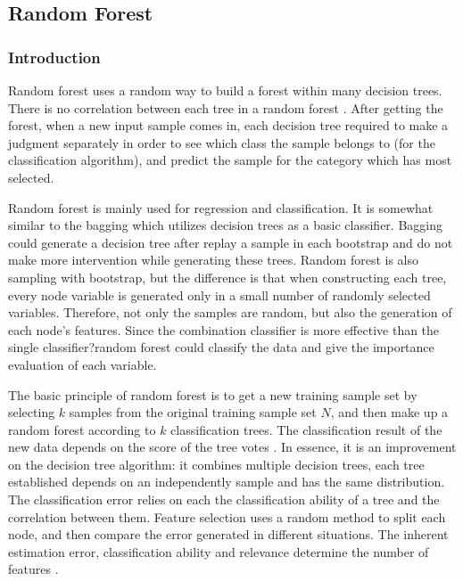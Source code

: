 \documentclass[sigconf]{acmart}
\begin{document}
\subsection{Random Forest}

\subsubsection{Introduction}

Random forest uses a random way to build a forest within many decision trees. There is no correlation between each tree in a random forest \cite{wiki.rf}. After getting the forest, when a new input sample comes in, each decision tree required to make a judgment separately in order to see which class the sample belongs to (for the classification algorithm), and predict the sample for the category which has most selected.

Random forest is mainly used for regression and classification. It is somewhat similar to the bagging which utilizes decision trees as a basic classifier. Bagging could generate a decision tree after replay a sample in each bootstrap and do not make more intervention while generating these trees. Random forest is also sampling with bootstrap, but the difference is that when constructing each tree, every node variable is generated only in a small number of randomly selected variables. Therefore, not only the samples are random, but also the generation of each node's features. Since the combination classifier is more effective than the single classifier?random forest could classify the data and give the importance evaluation of each variable.

The basic principle of random forest is to get a new training sample set by selecting $k$ samples from the original training sample set $N$, and then make up a random forest according to $k$ classification trees. The classification result of the new data depends on the score of the tree votes \cite{sp.rfc}. In essence, it is an improvement on the decision tree algorithm: it combines multiple decision trees, each tree established depends on an independently sample and has the same distribution. The classification error relies on each the classification ability of a tree and the correlation between them. Feature selection uses a random method to split each node, and then compare the error generated in different situations. The inherent estimation error, classification ability and relevance determine the number of features \cite{sp.rfc}.
\end{document}
